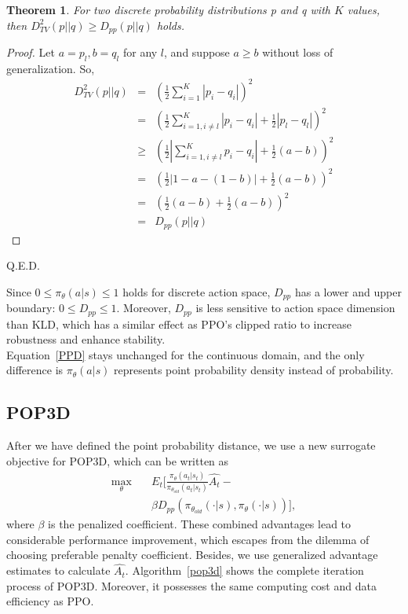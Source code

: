 \documentclass{article}
\newtheorem{theorem}{Theorem}
\newtheorem{proof}{Proof}
\begin{document}
\begin{theorem}
	For two discrete probability distributions p and q with $K$ values,  then $D_{TV}^2(p||q) \ge D_{pp}(p||q)$ holds.
\end{theorem}
\begin{proof}
	Let  $a=p_l, b=q_l$ for any $l$, and suppose $a\ge b$ without loss of generalization. So,
	\begin{eqnarray*}
		D_{TV}^2(p||q) & = & (\frac{1}{2}\sum_{i=1}^{K}|p_i-q_i|)^2 \\
		& = & (\frac{1}{2}\sum_{i=1,i\ne l}^K|p_i-q_i|+\frac{1}{2}|p_l-q_l|)^2 \\
		& \ge & (\frac{1}{2}|\sum_{i=1,i\ne l}^Kp_i-q_i|+\frac{1}{2}(a-b))^2 \\
		& = & (\frac{1}{2}|1-a-(1-b)| + \frac{1}{2}(a-b)) ^2\\
		& = & (\frac{1}{2}(a-b)+\frac{1}{2}(a-b))^2 \\
		& = & D_{pp}(p||q)
	\end{eqnarray*}
	
\end{proof}
Q.E.D.


Since $0\leq{\pi_{\theta}(a|s)}\leq1$ holds for discrete action space,  $D_{pp}$ has a lower and upper boundary: $0\leq D_{pp}\leq1$. Moreover, $D_{pp}$ is less sensitive to action space dimension than KLD, which has a similar effect as PPO's clipped ratio to increase robustness and enhance stability.\\

Equation~\ref{PPD} stays unchanged for the continuous domain, and the only difference is  $ \pi_{\theta}(a|s)$ represents point probability density instead of probability.
\subsection{POP3D}
After we have defined the point probability distance, we use a new surrogate objective for POP3D, which can be written as 
\begin{equation}\label{POP3DOBJ}
\begin{split}
\max_\theta \quad  & E_t [ \frac{\pi_\theta(a_t|s_t)}{\pi_{\theta_{old}}(a_t|s_t)} \hat{A_t} - \\
\quad & \beta D_{pp}(\pi_{\theta_{old}}(\cdot|s), \pi_{\theta}(\cdot|s))],
\end{split}
\end{equation}
where $\beta$ is the penalized coefficient. These combined advantages  lead to considerable performance improvement, which escapes from the dilemma of choosing preferable penalty coefficient. Besides, we use generalized advantage estimates to calculate $\hat{A_t}$. Algorithm~\ref{pop3d} shows the complete iteration process of POP3D. Moreover, it possesses the same computing cost and data efficiency as PPO. 
\end{document}
